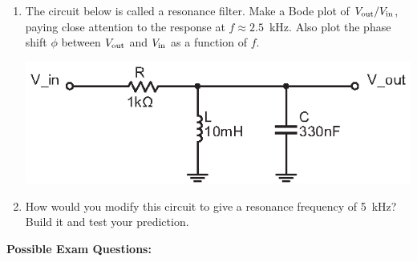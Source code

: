 \begin{enumerate}[wide]
\item The circuit below is called a resonance filter.  Make a Bode plot of $V_{\rm out}/V_{\rm in}$, paying close attention to the response at $f \approx 2.5$~kHz.  Also plot the phase shift $\phi$ between $V_{\rm out}$ and $V_{\rm in}$ as a function of $f$. 
\label{part_resonance_filter}
\begin{center}
\includegraphics{filters/LC_resonance_filter.eps}
\end{center}

\item How would you modify this circuit to give a resonance frequency of 5~kHz?   Build it and test your prediction.


\end{enumerate}

\pagebreak[3]
\textbf{Possible Exam Questions:}

